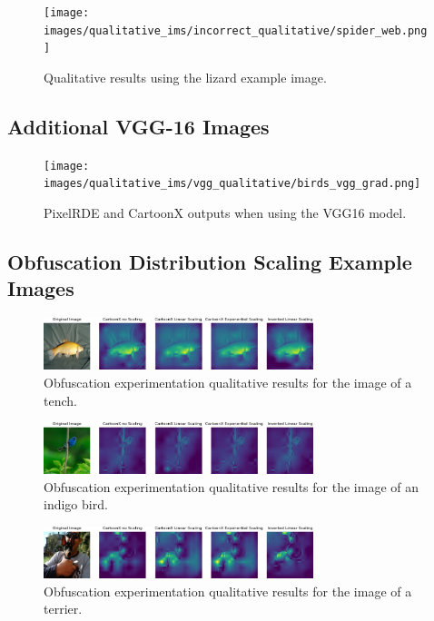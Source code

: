 \begin{figure}[H]
    \centering
    \texttt{[image: images/qualitative\_ims/incorrect\_qualitative/spider\_web.png]}
    \caption{Qualitative results using the lizard example image.}
    \label{fig:app-lizard}

\end{figure}

\subsection{Additional VGG-16 Images}


\begin{figure}[H]
    \centering
    \texttt{[image: images/qualitative\_ims/vgg\_qualitative/birds\_vgg\_grad.png]}
    \caption{PixelRDE and CartoonX outputs when using the VGG16 model.}
    \label{fig:app-birds-vgg}

\end{figure}

\subsection{Obfuscation Distribution Scaling Example Images}

\begin{figure}[H]
    \centering
    \includegraphics[width=0.7\textwidth]{images/qualitative_ims/obfuscation_examples/tench.JPEG}
    \caption{Obfuscation experimentation qualitative results for the image of a tench.}
    \label{fig:app-tench}

\end{figure}
\begin{figure}[H]
    \centering
    \includegraphics[width=0.7\textwidth]{images/qualitative_ims/obfuscation_examples/indigo.JPEG}
    \caption{Obfuscation experimentation qualitative results for the image of an indigo bird.}
    \label{fig:app-indigo-bird}

\end{figure}

\begin{figure}[H]
    \centering
    \includegraphics[width=0.7\textwidth]{images/qualitative_ims/obfuscation_examples/terrier.JPEG}
    \caption{Obfuscation experimentation qualitative results for the image of a terrier.}
    \label{fig:app-terrier}

\end{figure}
